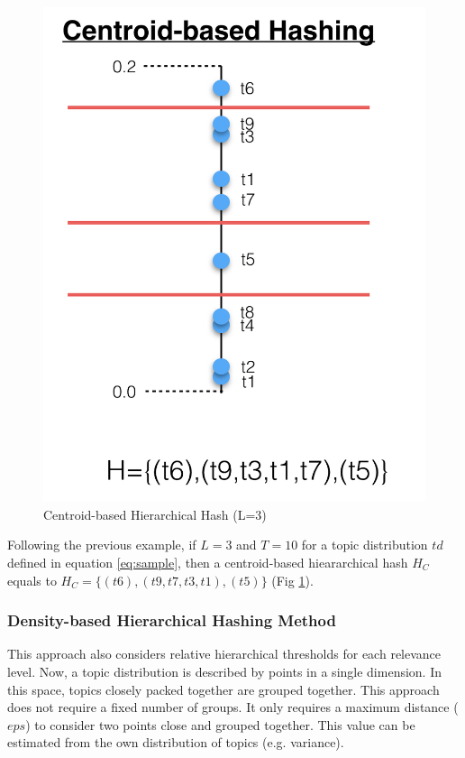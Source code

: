 \begin{figure}[t]\centering
\includegraphics[scale=0.35]{centroid-hash.png}
\caption{Centroid-based Hierarchical Hash (L=3)}
\label{fig:centroid_hash}
\end{figure}

Following the previous example, if $L=3$ and $T=10$ for a topic distribution $td$ defined in equation \ref{eq:sample}, then a centroid-based hieararchical hash $H_{C}$ equals to $H_{C}=\{(t6),(t9,t7,t3,t1),(t5)\}$ (Fig \ref{fig:centroid_hash}).


\subsubsection{Density-based Hierarchical Hashing Method}
\label{sec:comparison-density}
This approach also considers relative hierarchical thresholds for each relevance level. Now, a topic distribution is described by points in a single dimension. In this space, topics closely packed together are grouped together. This approach does not require a fixed number of groups. It only requires a maximum distance ($eps$) to consider two points close and grouped together. This value can be estimated from the own distribution of topics (e.g. variance).

